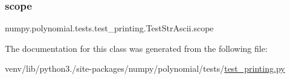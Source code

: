 \subsubsection{\texorpdfstring{scope}{scope}}
{\footnotesize\ttfamily numpy.\+polynomial.\+tests.\+test\+\_\+printing.\+Test\+Str\+Ascii.\+scope\hspace{0.3cm}{\ttfamily [static]}}



The documentation for this class was generated from the following file\+:\begin{DoxyCompactItemize}
\item 
venv/lib/python3./site-\/packages/numpy/polynomial/tests/\hyperlink{test__printing_8py}{test\+\_\+printing.\+py}\end{DoxyCompactItemize}
